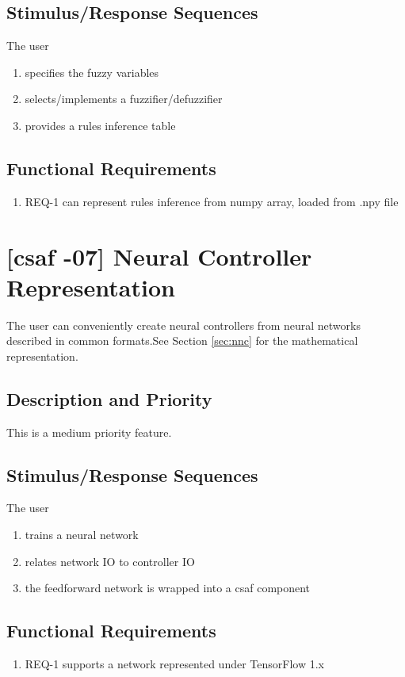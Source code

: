 \subsection{Stimulus/Response Sequences}
The user
\begin{enumerate}
\item specifies the fuzzy variables
\item selects/implements a fuzzifier/defuzzifier
\item provides a rules inference table
\end{enumerate}

\subsection{Functional Requirements}

\begin{enumerate}
\item REQ-1 \quad can represent rules inference from numpy array, loaded from .npy file
\end{enumerate}


\section{[\acrshort{csaf} -07] Neural Controller Representation}
The user can conveniently create neural controllers from neural networks described in common formats.See Section \ref{sec:nnc} for the mathematical representation.

\subsection{Description and Priority}
This is a medium priority feature.

\subsection{Stimulus/Response Sequences}
The user
\begin{enumerate}
\item trains a neural network
\item relates network IO to controller IO
\item the feedforward network is wrapped into a \acrshort{csaf}  component
\end{enumerate}

\subsection{Functional Requirements}
\begin{enumerate}
\item REQ-1 \quad supports a network represented under TensorFlow 1.x
\end{enumerate}

